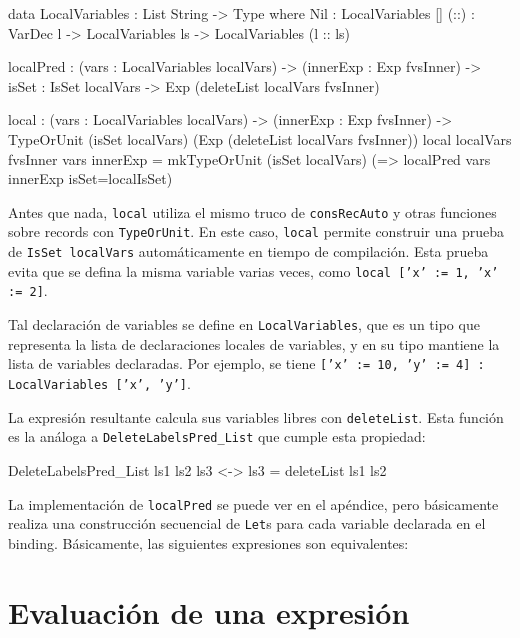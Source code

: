 \begin{code}
data LocalVariables : List String -> Type where
  Nil : LocalVariables []
  (::) : VarDec l -> LocalVariables ls ->
    LocalVariables (l :: ls)

localPred : (vars : LocalVariables localVars) ->
  (innerExp : Exp fvsInner) -> {isSet : IsSet localVars} ->
  Exp (deleteList localVars fvsInner)

local : (vars : LocalVariables localVars) -> (innerExp : Exp fvsInner) ->
  TypeOrUnit (isSet localVars) (Exp (deleteList localVars fvsInner))
local {localVars} {fvsInner} vars innerExp =
  mkTypeOrUnit (isSet localVars)
    (\localIsSet => localPred vars innerExp {isSet=localIsSet})
\end{code}

Antes que nada, \texttt{local} utiliza el mismo truco de \texttt{consRecAuto} y otras funciones sobre records con \texttt{TypeOrUnit}. En este caso, \texttt{local} permite construir una prueba de \texttt{IsSet localVars} automáticamente en tiempo de compilación. Esta prueba evita que se defina la misma variable varias veces, como \texttt{local ['x' := 1, 'x' := 2]}.

Tal declaración de variables se define en \texttt{LocalVariables}, que es un tipo que representa la lista de declaraciones locales de variables, y en su tipo mantiene la lista de variables declaradas. Por ejemplo, se tiene \texttt{['x' := 10, 'y' := 4] : LocalVariables ['x', 'y']}.

La expresión resultante calcula sus variables libres con \texttt{deleteList}. Esta función es la análoga a \texttt{DeleteLabelsPred\_List} que cumple esta propiedad:

\begin{code}
DeleteLabelsPred_List ls1 ls2 ls3 <-> ls3 = deleteList ls1 ls2
\end{code}

La implementación de \texttt{localPred} se puede ver en el apéndice, pero básicamente realiza una construcción secuencial de \texttt{Let}s para cada variable declarada en el binding. Básicamente, las siguientes expresiones son equivalentes:


\section{Evaluación de una expresión}

